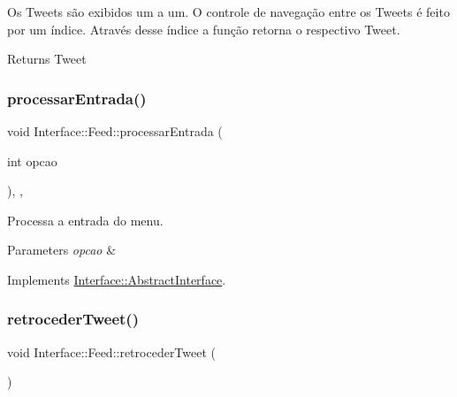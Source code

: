 Os Tweets são exibidos um a um. O controle de navegação entre os Tweets é feito por um índice. Através desse índice a função retorna o respectivo Tweet. 

\begin{DoxyReturn}{Returns}
Tweet 
\end{DoxyReturn}
\mbox{\label{class_interface_1_1_feed_a16fbbeb11ad125e2633bb72b0c2ab4bf}} 
\subsubsection{\texorpdfstring{processar\+Entrada()}{processarEntrada()}}
{\footnotesize\ttfamily void Interface\+::\+Feed\+::processar\+Entrada (\begin{DoxyParamCaption}\item[{int}]{opcao }\end{DoxyParamCaption})\hspace{0.3cm}{\ttfamily [override]}, {\ttfamily [private]}, {\ttfamily [virtual]}}



Processa a entrada do menu. 


\begin{DoxyParams}{Parameters}
{\em opcao} & \\
\hline
\end{DoxyParams}


Implements \hyperlink{class_interface_1_1_abstract_interface_a9318f98f907ce54ef2dbf892ba327da2}{Interface\+::\+Abstract\+Interface}.

\mbox{\label{class_interface_1_1_feed_aace561e639f20dbb5eb0b6662a4a637e}} 
\subsubsection{\texorpdfstring{retroceder\+Tweet()}{retrocederTweet()}}
{\footnotesize\ttfamily void Interface\+::\+Feed\+::retroceder\+Tweet (\begin{DoxyParamCaption}{ }\end{DoxyParamCaption})\hspace{0.3cm}{\ttfamily [private]}}



